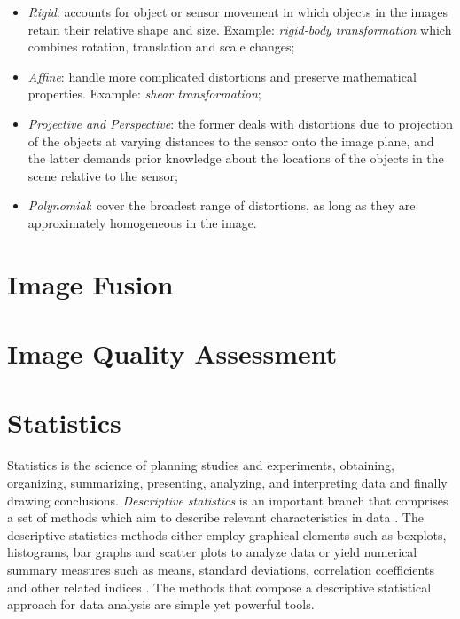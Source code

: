 \begin{itemize}
    \item \emph{Rigid}: accounts for object or sensor movement in which objects in the images retain their relative shape and size. Example: \emph{rigid-body transformation} which combines rotation, translation and scale changes; 
    
    \item \emph{Affine}: handle more complicated distortions and preserve mathematical properties. Example: \emph{shear transformation};
    
    \item \emph{Projective and Perspective}: the former deals with distortions due to projection of the objects at varying distances to the sensor onto the image plane, and the latter demands prior knowledge about the locations of the objects in the scene relative to the sensor;
    
    \item \emph{Polynomial}: cover the broadest range of distortions, as long as they are approximately homogeneous in the image.
\end{itemize}

\section{Image Fusion}


\section{Image Quality Assessment}


\section{Statistics}

Statistics is the science of planning studies and experiments, obtaining, organizing, summarizing, presenting, analyzing, and interpreting data and finally drawing conclusions. \emph{Descriptive statistics} is an important branch that comprises a set of methods which aim to describe relevant characteristics in data \cite{triola2017elementary}. The descriptive statistics methods either employ graphical elements such as boxplots, histograms, bar graphs and scatter plots to analyze data or yield numerical summary measures such as means, standard deviations, correlation coefficients and other related indices \cite{devore2011probability}. The methods that compose a descriptive statistical approach for data analysis are simple yet powerful tools.

